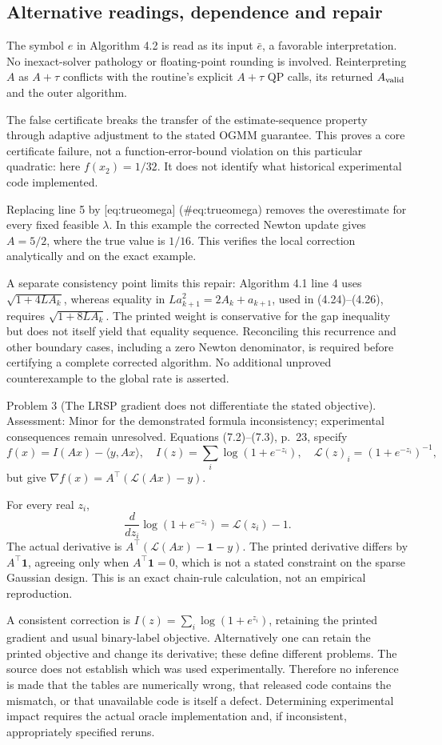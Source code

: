 \documentclass[10pt]{article}
\begin{document}
\subsection*{Alternative readings, dependence and repair}
The symbol \(e\) in Algorithm 4.2 is read as its input \(\bar e\), a favorable interpretation. No inexact-solver pathology or floating-point rounding is involved. Reinterpreting \(A\) as \(A+\tau\) conflicts with the routine’s explicit \(A+\tau\) QP calls, its returned \(A_{\rm valid}\) and the outer algorithm.\par
The false certificate breaks the transfer of the estimate-sequence property through adaptive adjustment to the stated OGMM guarantee. This proves a core certificate failure, not a function-error-bound violation on this particular quadratic: here \(f(x_2)=1/32\). It does not identify what historical experimental code implemented.\par
Replacing line 5 by [eq:trueomega] (\#eq:trueomega) removes the overestimate for every fixed feasible \(\lambda\). In this example the corrected Newton update gives \(A=5/2\), where the true value is \(1/16\). This verifies the local correction analytically and on the exact example.\par
A separate consistency point limits this repair: Algorithm 4.1 line 4 uses \(\sqrt{1+4LA_k}\), whereas equality in \(La_{k+1}^2=2A_k+a_{k+1}\), used in (4.24)–(4.26), requires \(\sqrt{1+8LA_k}\). The printed weight is conservative for the gap inequality but does not itself yield that equality sequence. Reconciling this recurrence and other boundary cases, including a zero Newton denominator, is required before certifying a complete corrected algorithm. No additional unproved counterexample to the global rate is asserted.\par
Problem 3 (The LRSP gradient does not differentiate the stated objective).  Assessment: Minor for the demonstrated formula inconsistency; experimental consequences remain unresolved. Equations (7.2)–(7.3), p. 23, specify \[f(x)=I(Ax)-\langle y,Ax\rangle,\quad
 I(z)=\sum_i\log(1+e^{-z_i}),\quad
 \mathcal{L}(z)_i=(1+e^{-z_i})^{-1},\] but give \(\nabla f(x)=A^\top(\mathcal{L}(Ax)-y)\).\par
For every real \(z_i\), \[\frac{d}{dz_i}\log(1+e^{-z_i})=\mathcal{L}(z_i)-1.\] The actual derivative is \(A^\top(\mathcal{L}(Ax)-\mathbf1-y)\). The printed derivative differs by \(A^\top\mathbf1\), agreeing only when \(A^\top\mathbf1=0\), which is not a stated constraint on the sparse Gaussian design. This is an exact chain-rule calculation, not an empirical reproduction.\par
A consistent correction is \(I(z)=\sum_i\log(1+e^{z_i})\), retaining the printed gradient and usual binary-label objective. Alternatively one can retain the printed objective and change its derivative; these define different problems. The source does not establish which was used experimentally. Therefore no inference is made that the tables are numerically wrong, that released code contains the mismatch, or that unavailable code is itself a defect. Determining experimental impact requires the actual oracle implementation and, if inconsistent, appropriately specified reruns.\par
\end{document}
